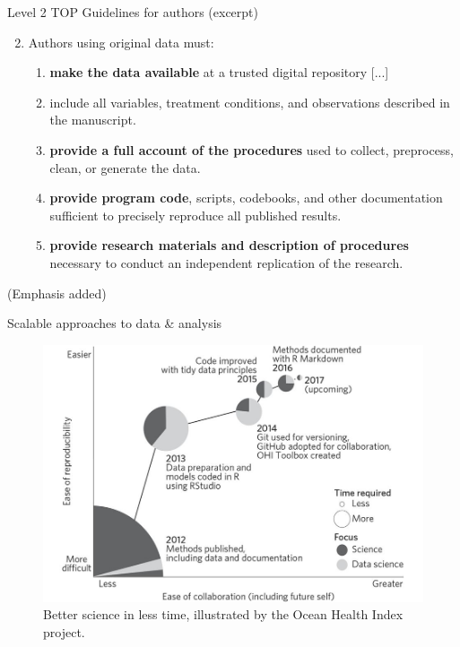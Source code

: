 \documentclass[aspectratio=169, 11pt]{beamer} %
\begin{document}
\begin{frame}{Level 2 TOP Guidelines for authors (excerpt)}
  
    \begin{enumerate}[label=\arabic*.]
        \setcounter{enumi}{1}
        
        \item Authors using original data must:
        \begin{enumerate}[label=\alph*.]
            \item \textbf{make the data available} at a trusted digital repository [...]
            \item include all variables, treatment conditions, and observations described in the manuscript.
            \item \textbf{provide a full account of the procedures} used to collect, preprocess, clean, or generate the data.
            \item \textbf{provide program code}, scripts, codebooks, and other documentation sufficient to precisely reproduce all published results.
            \item \textbf{provide research materials and description of procedures} necessary to conduct an independent replication of the research.
        \end{enumerate}
    \end{enumerate}
    (Emphasis added) \cite{Osf2014-pf}
\end{frame}

\begin{frame}{Scalable approaches to data \& analysis}
  \begin{figure}[H]
    \centering
        \includegraphics[height=.7\textheight]{figures/Ocean-Health-Index.jpg}
        \caption{Better science in less time, illustrated by the Ocean Health Index project. \cite{Stewart_Lowndes2017-lj}}
        \label{fig:stewart_lowndes}
  \end{figure}
\end{frame}
\end{document}
